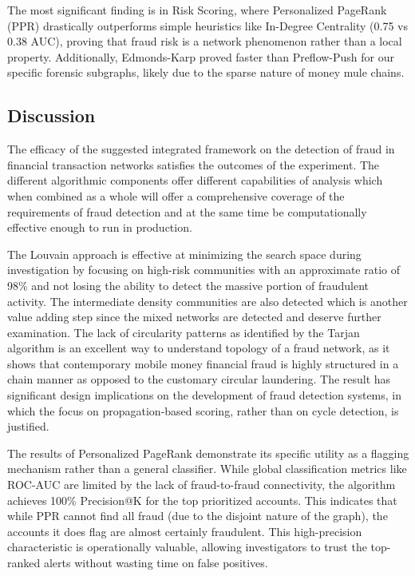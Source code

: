 \documentclass[lettersize,journal]{IEEEtran}
\begin{document}
The most significant finding is in Risk Scoring, where Personalized PageRank (PPR) drastically outperforms simple heuristics like In-Degree Centrality (0.75 vs 0.38 AUC), proving that fraud risk is a network phenomenon rather than a local property. Additionally, Edmonds-Karp proved faster than Preflow-Push for our specific forensic subgraphs, likely due to the sparse nature of money mule chains.

\subsection{Discussion}
The efficacy of the suggested integrated framework on the detection of fraud in financial transaction networks satisfies the outcomes of the experiment. The different algorithmic components offer different capabilities of analysis which when combined as a whole will offer a comprehensive coverage of the requirements of fraud detection and at the same time be computationally effective enough to run in production.

The Louvain approach is effective at minimizing the search space during investigation by focusing on high-risk communities with an approximate ratio of 98\% and not losing the ability to detect the massive portion of fraudulent activity. The intermediate density communities are also detected which is another value adding step since the mixed networks are detected and deserve further examination. The lack of circularity patterns as identified by the Tarjan algorithm is an excellent way to understand topology of a fraud network, as it shows that contemporary mobile money financial fraud is highly structured in a chain manner as opposed to the customary circular laundering. The result has significant design implications on the development of fraud detection systems, in which the focus on propagation-based scoring, rather than on cycle detection, is justified.

The results of Personalized PageRank demonstrate its specific utility as a flagging mechanism rather than a general classifier. While global classification metrics like ROC-AUC are limited by the lack of fraud-to-fraud connectivity, the algorithm achieves 100\% Precision@K for the top prioritized accounts. This indicates that while PPR cannot find all fraud (due to the disjoint nature of the graph), the accounts it does flag are almost certainly fraudulent. This high-precision characteristic is operationally valuable, allowing investigators to trust the top-ranked alerts without wasting time on false positives.
\end{document}
